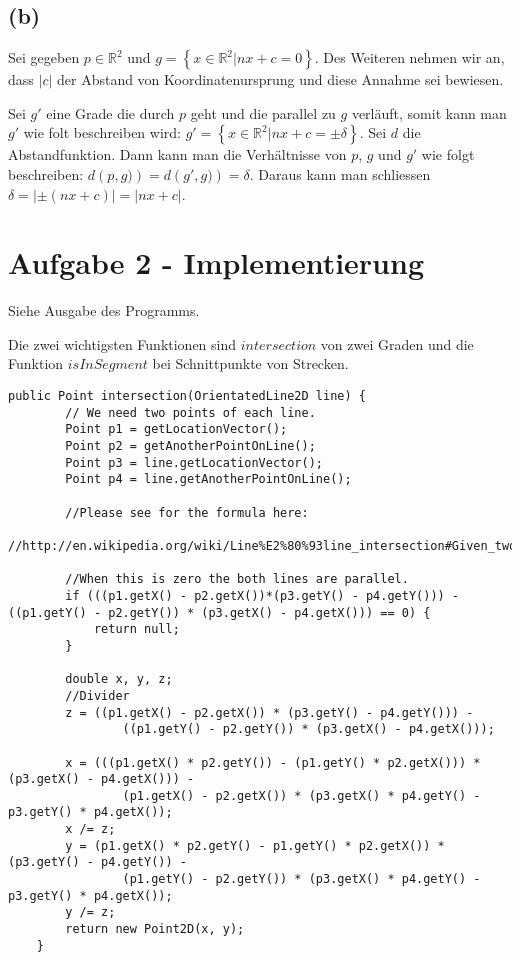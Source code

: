 \documentclass[a4paper]{article}
\begin{document}
\subsection*{(b)}

Sei gegeben $p \in \mathbb{R}^2$ und $g = \left\{x \in \mathbb{R}^2| nx + c = 0 \right\}$. Des Weiteren nehmen wir an, dass $|c|$ der Abstand von Koordinatenursprung und diese Annahme sei bewiesen.

Sei $g'$ eine Grade die durch $p$ geht und die parallel zu $g$ verläuft, somit kann man $g'$ wie folt beschreiben wird: $g' = \left\{x \in \mathbb{R}^2| nx + c = \pm \delta \right\}$. Sei $d$ die Abstandfunktion. Dann kann man die Verhältnisse von $p$, $g$ und $g'$ wie folgt beschreiben: $d\left(p,g)\right) = d\left(g',g)\right) = \delta$. Daraus kann man schliessen $\delta = | \pm \left(nx+c\right)| = |nx+c|$.


\section*{Aufgabe 2 - Implementierung}

Siehe Ausgabe des Programms.

Die zwei wichtigsten Funktionen sind $intersection$ von zwei Graden und die Funktion $isInSegment$ bei Schnittpunkte von Strecken. 

\begin{lstlisting}
public Point intersection(OrientatedLine2D line) {
        // We need two points of each line.
        Point p1 = getLocationVector();
        Point p2 = getAnotherPointOnLine();
        Point p3 = line.getLocationVector();
        Point p4 = line.getAnotherPointOnLine();

        //Please see for the formula here:
        //http://en.wikipedia.org/wiki/Line%E2%80%93line_intersection#Given_two_points_on_each_line

        //When this is zero the both lines are parallel.
        if (((p1.getX() - p2.getX())*(p3.getY() - p4.getY())) - ((p1.getY() - p2.getY()) * (p3.getX() - p4.getX())) == 0) {
            return null;
        }

        double x, y, z;
        //Divider
        z = ((p1.getX() - p2.getX()) * (p3.getY() - p4.getY())) -
                ((p1.getY() - p2.getY()) * (p3.getX() - p4.getX()));

        x = (((p1.getX() * p2.getY()) - (p1.getY() * p2.getX())) * (p3.getX() - p4.getX())) -
                (p1.getX() - p2.getX()) * (p3.getX() * p4.getY() - p3.getY() * p4.getX());
        x /= z;
        y = (p1.getX() * p2.getY() - p1.getY() * p2.getX()) * (p3.getY() - p4.getY()) -
                (p1.getY() - p2.getY()) * (p3.getX() * p4.getY() - p3.getY() * p4.getX());
        y /= z;
        return new Point2D(x, y);
    }
\end{lstlisting}
\end{document}
